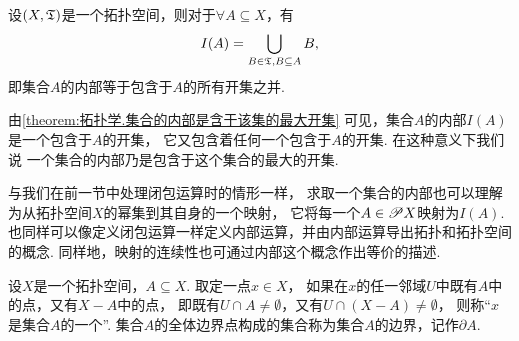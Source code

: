 \begin{theorem}\label{theorem:拓扑学.集合的内部是含于该集的最大开集}
设\((X,\mathfrak T)\)是一个拓扑空间，则对于\(\forall A \subseteq X\)，有\[
I(A) = \bigcup\limits_{B \in \mathfrak T, B \subseteq A} B,
\]
即集合\(A\)的内部等于包含于\(A\)的所有开集之并.
\end{theorem}

由\cref{theorem:拓扑学.集合的内部是含于该集的最大开集}
可见，集合\(A\)的内部\(I(A)\)是一个包含于\(A\)的开集，
它又包含着任何一个包含于\(A\)的开集.
在这种意义下我们说
一个集合的内部乃是包含于这个集合的最大的开集.

与我们在前一节中处理闭包运算时的情形一样，
求取一个集合的内部也可以理解为从拓扑空间\(X\)的幂集到其自身的一个映射，
它将每一个\(A \in \mathscr{P} X\)映射为\(I(A)\).
也同样可以像定义闭包运算一样定义内部运算，并由内部运算导出拓扑和拓扑空间的概念.
同样地，映射的连续性也可通过内部这个概念作出等价的描述.

\begin{definition}\label{definition:拓扑学.边界的概念}
设\(X\)是一个拓扑空间，\(A \subseteq X\).
取定一点\(x \in X\)，
如果在\(x\)的任一邻域\(U\)中既有\(A\)中的点，又有\(X - A\)中的点，
即既有\(U \cap A \neq \emptyset\)，又有\(U \cap (X-A) \neq \emptyset\)，
则称“\(x\)是集合\(A\)的一个”.
集合\(A\)的全体边界点构成的集合称为集合\(A\)的边界，记作\(\partial A\).
\end{definition}

\endgroup
